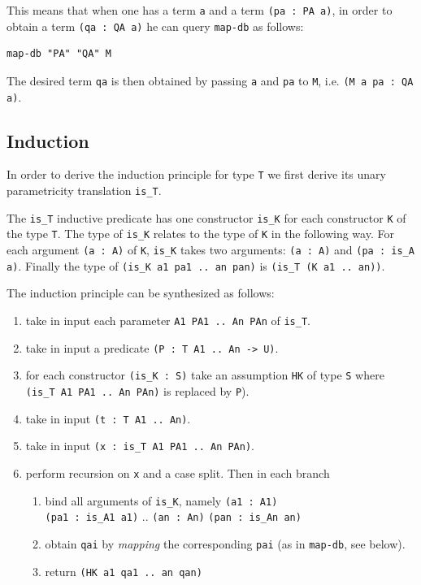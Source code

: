 \documentclass[sigplan,10pt,review]{acmart}\settopmatter{printfolios=true,printccs=false,printacmref=false}
\begin{document}
\noindent
This means that when one has a term \lstinline+a+
and a term \lstinline+(pa : PA a)+, in order to
obtain a term \lstinline+(qa : QA a)+ he can
query \lstinline+map-db+ as follows:

\begin{minipage}{\textwidth}\begin{lstlisting}[]
map-db "PA" "QA" M
\end{lstlisting}\end{minipage}

\noindent
The desired term \lstinline+qa+ is then
obtained by passing
\lstinline+a+ and \lstinline+pa+ to \lstinline+M+, i.e.
\lstinline+(M a pa : QA a)+.

\subsection{Induction} %
\label{sec:induction}

In order to derive the induction principle for type
\lstinline+T+ we first derive its unary parametricity
translation \lstinline+is_T+. 

The \lstinline+is_T+ inductive
predicate has one constructor \lstinline+is_K+ for each
constructor \lstinline+K+ of the type \lstinline+T+.
The type of \lstinline+is_K+ relates to the type of
\lstinline+K+ in the following way. For each
argument \lstinline+(a : A)+
of \lstinline+K+, \lstinline+is_K+ takes two arguments:
\lstinline+(a : A)+ and \lstinline+(pa : is_A a)+.
Finally the type of \lstinline+(is_K a1 pa1 .. an pan)+ is
\lstinline+(is_T (K a1 .. an))+.

The induction principle can be synthesized as follows:
\begin{enumerate}
\item take in input each parameter
  \lstinline+A1 PA1 .. An PAn+ of \lstinline+is_T+.
\item take in input a predicate \lstinline+(P : T A1 .. An -> U)+.
\item for each constructor \lstinline+(is_K : S)+ 
  take an assumption \lstinline+HK+ of type
  \lstinline+S+ where \lstinline+(is_T A1 PA1 .. An PAn)+
		is replaced by  \lstinline+P+).
\item take in input \lstinline+(t : T A1 .. An)+.
\item take in input \lstinline+(x : is_T A1 PA1 .. An PAn)+.
\item perform recursion on \lstinline+x+ and a case split. Then
	in each branch
\begin{enumerate}
\item bind all arguments of \lstinline+is_K+, namely
  \lstinline+(a1 : A1)+ \\\lstinline+(pa1 : is_A1 a1)+ ..
		\lstinline+(an : An)+ \lstinline+(pan : is_An an)+
\item obtain
  \lstinline+qai+ by \emph{mapping} the corresponding
  \lstinline+pai+ (as in \lstinline+map-db+, see below).
\item return \lstinline+(HK a1 qa1 .. an qan)+
\end{enumerate}
\end{enumerate}
\end{document}
